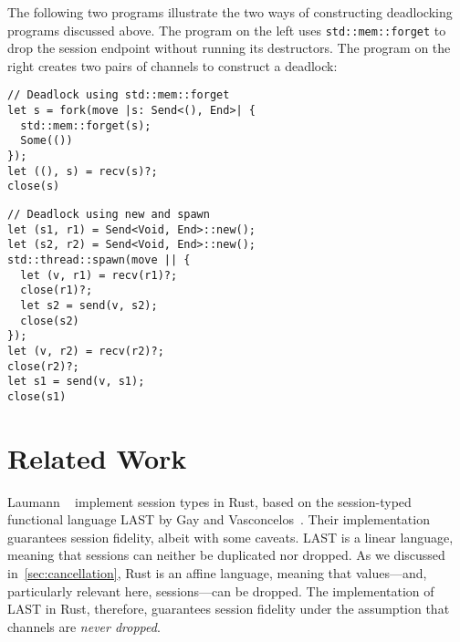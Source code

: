 \documentclass[copyright,creativecommons]{eptcs}
\begin{document}
The following two programs illustrate the two ways of constructing deadlocking programs discussed above. The program on the left uses \lstinline{std::mem::forget} to drop the session endpoint without running its destructors. The program on the right creates two pairs of channels to construct a deadlock:
\vspace{-0.5\baselineskip}
\begin{minipage}[t]{0.5\linewidth}
\begin{lstlisting}
// Deadlock using std::mem::forget
let s = fork(move |s: Send<(), End>| {
  std::mem::forget(s);
  Some(())
});
let ((), s) = recv(s)?;
close(s)
\end{lstlisting}
\end{minipage}%
\begin{minipage}[t]{0.5\linewidth}
\begin{lstlisting}
// Deadlock using new and spawn
let (s1, r1) = Send<Void, End>::new();
let (s2, r2) = Send<Void, End>::new();
std::thread::spawn(move || {
  let (v, r1) = recv(r1)?;
  close(r1)?;
  let s2 = send(v, s2);
  close(s2)
});
let (v, r2) = recv(r2)?;
close(r2)?;
let s1 = send(v, s1);
close(s1)
\end{lstlisting}
\end{minipage}
\vspace{-0.25\baselineskip}

\section{Related Work}\label{sec:related-work}
Laumann \etal~\cite{jespersen2015} implement session types in Rust, based on the session-typed functional language LAST by Gay and Vasconcelos~\cite{gay2009}. Their implementation guarantees session fidelity, albeit with some caveats. LAST is a linear language, meaning that sessions can neither be duplicated nor dropped. As we discussed in~\cref{sec:cancellation}, Rust is an affine language, meaning that values---and, particularly relevant here, sessions---can be dropped. The implementation of LAST in Rust, therefore, guarantees session fidelity under the assumption that channels are \emph{never dropped}.
\end{document}
